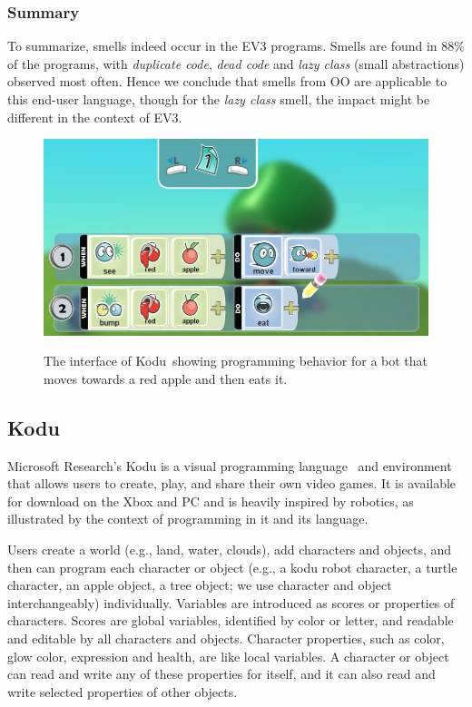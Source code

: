 \documentclass{sig-alternate}
\newcommand{\todo}[1]{\textbf{TODO: #1}}
\begin{document}
\subsubsection{Summary}
To summarize, smells indeed occur in the EV3 programs. Smells are found in 88\% of the programs, with \emph{duplicate code}, \emph{dead code} and \emph{lazy class} (small abstractions) observed most often. Hence we conclude that smells from OO are applicable to this end-user language, though for the \emph{lazy class} smell, the impact might be different in the context of EV3. 

\begin{figure}[ht]
\caption{The interface of Kodu~showing programming behavior for a bot that moves towards a red apple and then eats it.}
\centering
\includegraphics[width=\columnwidth]{programmingui.png}
\label{fig:Kodu}
\end{figure}


\subsection{Kodu}
Microsoft Research's Kodu is a visual programming language~\cite{kodugrammar} and environment that allows users to create, play, and share their own video games. 
It is available for download on the Xbox and PC and is heavily inspired by robotics, as illustrated by the context of programming in it and its language. 

Users create a world (e.g., land, water, clouds),  add characters and objects, and then can program each character or object (e.g., a kodu robot character, a turtle character, an apple object, a tree object; we use character and object interchangeably) individually. Variables are introduced as scores or properties of characters. Scores are global variables, identified by color or letter, and readable and editable by all characters and objects. Character properties, such as color, glow color, expression and health, are like local variables. A character or object can read and write any of these properties for itself, and it can also read and write selected properties of other objects. 
\end{document}
